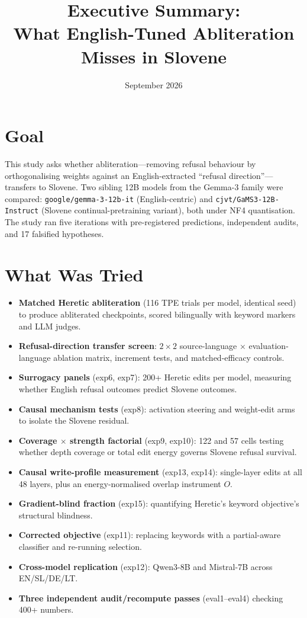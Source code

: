 \documentclass[11pt,letterpaper]{article}
\title{Executive Summary:\\What English-Tuned Abliteration Misses in Slovene}
\author{}
\date{September 2026}
\begin{document}
\maketitle

\section{Goal}

This study asks whether abliteration---removing refusal behaviour by orthogonalising weights against an English-extracted ``refusal direction''---transfers to Slovene. Two sibling 12B models from the Gemma-3 family were compared: \texttt{google/gemma-3-12b-it} (English-centric) and \texttt{cjvt/GaMS3-12B-Instruct} (Slovene continual-pretraining variant), both under NF4 quantisation. The study ran five iterations with pre-registered predictions, independent audits, and 17 falsified hypotheses.

\section{What Was Tried}

\begin{itemize}
\item \textbf{Matched Heretic abliteration} (116 TPE trials per model, identical seed) to produce abliterated checkpoints, scored bilingually with keyword markers and LLM judges.
\item \textbf{Refusal-direction transfer screen}: $2\times2$ source-language $\times$ evaluation-language ablation matrix, increment tests, and matched-efficacy controls.
\item \textbf{Surrogacy panels} (exp6, exp7): 200+ Heretic edits per model, measuring whether English refusal outcomes predict Slovene outcomes.
\item \textbf{Causal mechanism tests} (exp8): activation steering and weight-edit arms to isolate the Slovene residual.
\item \textbf{Coverage $\times$ strength factorial} (exp9, exp10): 122 and 57 cells testing whether depth coverage or total edit energy governs Slovene refusal survival.
\item \textbf{Causal write-profile measurement} (exp13, exp14): single-layer edits at all 48 layers, plus an energy-normalised overlap instrument $O$.
\item \textbf{Gradient-blind fraction} (exp15): quantifying Heretic's keyword objective's structural blindness.
\item \textbf{Corrected objective} (exp11): replacing keywords with a partial-aware classifier and re-running selection.
\item \textbf{Cross-model replication} (exp12): Qwen3-8B and Mistral-7B across EN/SL/DE/LT.
\item \textbf{Three independent audit/recompute passes} (eval1--eval4) checking 400+ numbers.
\end{itemize}
\end{document}
